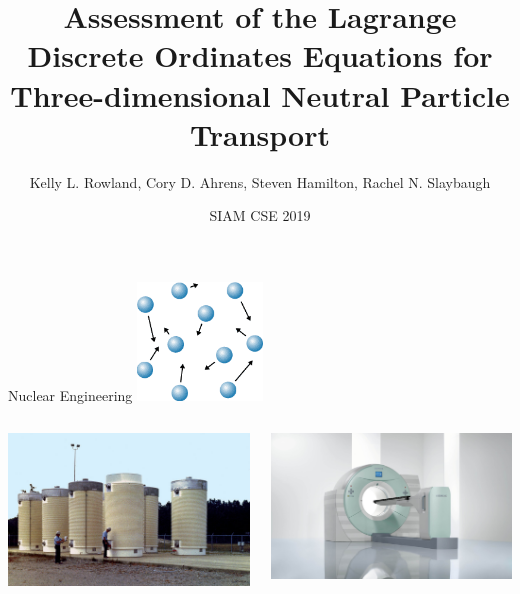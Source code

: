 \documentclass{beamer}
\title[Assessment of the LDO Equations for 3D Neutral Particle Transport]
{Assessment of the Lagrange Discrete Ordinates Equations for Three-dimensional Neutral Particle Transport}
\author[Kelly L. Rowland et al.]{Kelly L. Rowland, Cory D. Ahrens, Steven Hamilton, Rachel N. Slaybaugh}
\date{SIAM CSE 2019}
\begin{document}
\begin{frame}[plain]
	\titlepage
\end{frame}

\begin{frame}{Nuclear Engineering}
%
\pause
%
\center
\includegraphics[width=0.25\textwidth,natwidth=212,natheight=200]{img/particles.png}
%
\pause
%
\begin{columns}
\begin{column}{0.5\textwidth}
\center
\includegraphics[width=\textwidth,natwidth=1024,natheight=648]{img/nuclear_dry_storage.jpg}
\end{column}
\pause
\begin{column}{0.5\textwidth}
\center
\includegraphics[width=\textwidth,natwidth=2369,natheight=1433]{img/pet-spect.jpg}
\end{column}
\end{columns}
%
\end{frame}
\end{document}
